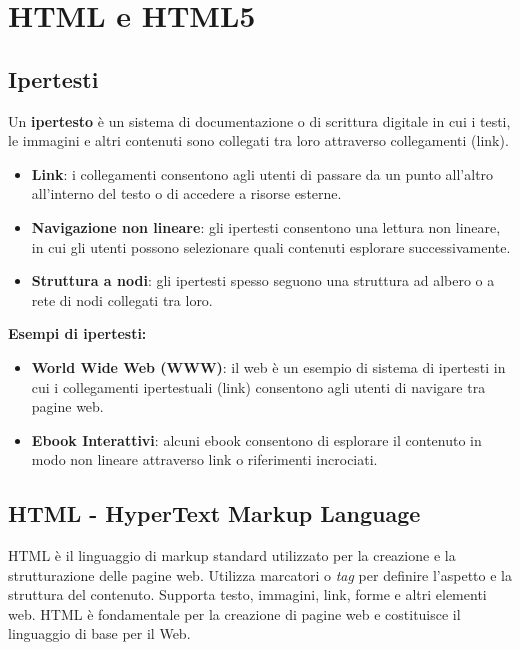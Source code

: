 \chapter{HTML e HTML5}

\section{Ipertesti}

Un \textbf{ipertesto} è un sistema di documentazione o di scrittura digitale in cui i testi, le immagini e altri contenuti sono collegati tra loro attraverso collegamenti (link).

\begin{itemize}
    \item \textbf{Link}: i collegamenti consentono agli utenti di passare da un punto all'altro all'interno del testo o di accedere a risorse esterne.
    \item \textbf{Navigazione non lineare}: gli ipertesti consentono una lettura non lineare, in cui gli utenti possono selezionare quali contenuti esplorare successivamente.
    \item \textbf{Struttura a nodi}: gli ipertesti spesso seguono una struttura ad albero o a rete di nodi collegati tra loro.
\end{itemize}

\textbf{Esempi di ipertesti:}
\begin{itemize}
    \item \textbf{World Wide Web (WWW)}: il web è un esempio di sistema di ipertesti in cui i collegamenti ipertestuali (link) consentono agli utenti di navigare tra pagine web.
    \item \textbf{Ebook Interattivi}: alcuni ebook consentono di esplorare il contenuto in modo non lineare attraverso link o riferimenti incrociati.
\end{itemize}

\section{HTML - HyperText Markup Language}

HTML è il linguaggio di markup standard utilizzato per la creazione e la strutturazione delle pagine web. Utilizza marcatori o \textit{tag} per definire l'aspetto e la struttura del contenuto. Supporta testo, immagini, link, forme e altri elementi web. HTML è fondamentale per la creazione di pagine web e costituisce il linguaggio di base per il Web.

